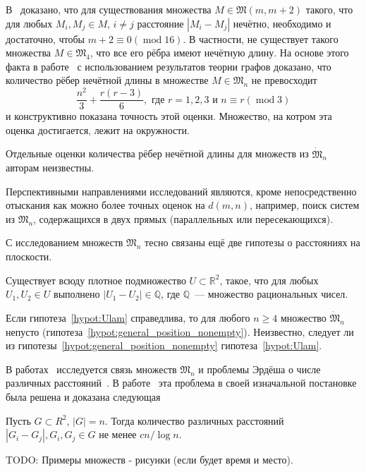 В~\cite{graham1974there} доказано, что
для существования множества $M\in\mathfrak{M}(m,m+2)$ такого, что для любых
$M_i,M_j\in M$, $i\neq j$ расстояние $|M_i-M_j|$ нечётно,
необходимо и достаточно, чтобы
$m+2\equiv 0 (\operatorname{mod} 16)$.
В частности, не существует такого множества $M\in\mathfrak{M}_4$,
что все его рёбра имеют нечётную длину.
На основе этого факта в работе~\cite{piepmeyer1996maximum} с использованием результатов теории графов доказано,
что количество рёбер нечётной длины в множестве $M\in\mathfrak{M}_n$ не превосходит
\begin{equation}
	\frac{n^2}{3} + \frac{r(r - 3)}{6}, \mbox{~где~} r = 1, 2, 3 \mbox{~и~} n \equiv r (\operatorname{mod} 3)
\end{equation}
и конструктивно показана точность этой оценки.
Множество, на котром эта оценка достигается, лежит на окружности.

Отдельные оценки количества рёбер нечётной длины для множеств из $\dot{\mathfrak{M}}_n$
авторам неизвестны.








Перспективными направлениями исследований являются, кроме непосредственно отыскания как можно более точных оценок на $d(m,n)$,
например, поиск систем из $\mathfrak{M}_n$, содержащихся в двух прямых (параллельных или пересекающихся).




С исследованием множеств $\mathfrak{M}_n$ тесно связаны ещё две гипотезы о расстояниях на плоскости.
\begin{hypothesis}
	\label{hypot:Ulam}
	Существует всюду плотное подмножество $U\subset\mathbb{R}^2$, такое,
	что для любых $U_1, U_2 \in U$ выполнено $|U_1 - U_2|\in\mathbb{Q}$,
	где $\mathbb{Q}$~--- множество рациональных чисел.
\end{hypothesis}
Если гипотеза~\ref{hypot:Ulam} справедлива, то для любого $n\geq 4$ множество $\dot{\mathfrak{M}}_n$ непусто
(гипотеза~\ref{hypot:general_position_nonempty}).
Неизвестно, следует ли из
гипотезы~\ref{hypot:general_position_nonempty} гипотеза~\ref{hypot:Ulam}.


В работах~\cite{garibaldi2005erdos,garibaldi2011erdos} исследуется связь множеств $\mathfrak{M}_n$ и
проблемы Эрдёша о числе различных расстояний~\cite{erdos1946sets}.
В работе~\cite{guth2015erdos} эта проблема в своей изначальной постановке была решена и доказана следующая
\begin{theorem}
	Пусть $G\subset{R}^2$, $|G| = n$.
	Тогда количество различных расстояний $|G_i - G_j|, G_i,G_j \in G$
	не менее $cn/\log n $.
\end{theorem}




TODO: Примеры множеств - рисунки (если будет время и место).


